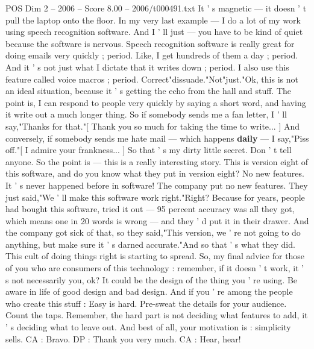 \begin{textsample}{POS Dim 2 – 2006 – Score 8.00 – 2006/t000491.txt}
It ' s magnetic — it doesn ' t pull the laptop onto the floor.
In my very last example — I do a lot of my work using speech recognition software.
And I ' ll just — you have to be kind of quiet because the software is nervous.
Speech recognition software is really great for doing emails very quickly ; period.
Like, I get hundreds of them a day ; period.
And it ' s not just what I dictate that it writes down ; period.
I also use this feature called voice macros ; period.
Correct"dissuade."Not"just."Ok, this is not an ideal situation, because it ' s getting the echo from the hall and stuff.
The point is, I can respond to people very quickly by saying a short word, and having it write out a much longer thing.
So if somebody sends me a fan letter, I ' ll say,"Thanks for that."[ Thank you so much for taking the time to write... ] And conversely, if somebody sends me hate mail — which happens \textbf{daily} — I say,"Piss off."[ I admire your frankness... ] So that ' s my dirty little secret.
Don ' t tell anyone.
So the point is — this is a really interesting story.
This is version eight of this software, and do you know what they put in version eight?
No new features.
It ' s never happened before in software!
The company put no new features.
They just said,"We ' ll make this software work right."Right?
Because for years, people had bought this software, tried it out — 95 percent accuracy was all they got, which means one in 20 words is wrong — and they ' d put it in their drawer.
And the company got sick of that, so they said,"This version, we ' re not going to do anything, but make sure it ' s darned accurate."And so that ' s what they did.
This cult of doing things right is starting to spread.
So, my final advice for those of you who are consumers of this technology : remember, if it doesn ' t work, it ' s not necessarily you, ok?
It could be the design of the thing you ' re using.
Be aware in life of good design and bad design.
And if you ' re among the people who create this stuff : Easy is hard.
Pre-sweat the details for your audience.
Count the taps.
Remember, the hard part is not deciding what features to add, it ' s deciding what to leave out.
And best of all, your motivation is : simplicity sells.
CA : Bravo.
DP : Thank you very much.
CA : Hear, hear!

\end{textsample}
